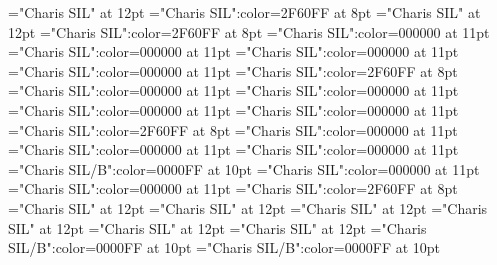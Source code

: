 \documentclass[a4paper]{article}
\begin{document}
\font\xitemptdefinitionLcptsensesensesentrybletDatadicBody="Charis SIL" at 12pt
\font\xlanguagetagenxitemptdefinitionLcptsensesensesentrybletDatadicBody="Charis SIL":color=2F60FF at 8pt
\font\xitemendefinitionLcptsensesensesentrybletDatadicBody="Charis SIL" at 12pt
\font\xlanguagetagenxitemendefinitionLcptsensesensesentrybletDatadicBody="Charis SIL":color=2F60FF at 8pt
\font\relationssensesensesentryletDatadicBody="Charis SIL":color=000000 at 11pt
\font\lexreftargetsrelationssensesensesentryletDatadicBody="Charis SIL":color=000000 at 11pt
\font\sensecrossrefsehlexreftargetsrelationssensesensesentryletDatadicBody="Charis SIL":color=000000 at 11pt
\font{}="Charis SIL":color=000000 at 11pt
\font\xlanguagetagendefinitionptsensesensesentryletDatadicBody="Charis SIL":color=2F60FF at 8pt
\font\examplessensesensesentryletDatadicBody="Charis SIL":color=000000 at 11pt
\font\examplesehexamplessensesensesentryletDatadicBody="Charis SIL":color=000000 at 11pt
\font\translationsexamplessensesensesentryletDatadicBody="Charis SIL":color=000000 at 11pt
\font\translationpttranslationsexamplessensesensesentryletDatadicBody="Charis SIL":color=000000 at 11pt
\font\xlanguagetagentranslationpttranslationsexamplessensesensesentryletDatadicBody="Charis SIL":color=2F60FF at 8pt
\font\xitemrelationssensesensesentryletDatadicBody="Charis SIL":color=000000 at 11pt
\font\lexreftargetsxitemrelationssensesensesentryletDatadicBody="Charis SIL":color=000000 at 11pt
\font\sensecrossrefsehlexreftargetsxitemrelationssensesensesentryletDatadicBody="Charis SIL":color=000000 at 11pt
\font\xhomographnumberptheadwordsehentryletDatadicBody="Charis SIL/B":color=0000FF at 10pt
\font\xsensenumberLcensensesensesentryletDatadicBody="Charis SIL":color=000000 at 11pt
\font{}="Charis SIL":color=000000 at 11pt
\font\xlanguagetagendefinitionLcensensesensesentryletDatadicBody="Charis SIL":color=2F60FF at 8pt
\font\entrycletDatadicBody="Charis SIL" at 12pt
\font\pictureRightNoneentrycletDatadicBody="Charis SIL" at 12pt
\font\picturepictureRightNoneentrycletDatadicBody="Charis SIL" at 12pt
\font\pictureCaptionpictureRightNoneentrycletDatadicBody="Charis SIL" at 12pt
\font\CmPicturepublishStemCaptionSenseNumberpictureCaptionpictureRightNoneentrycletDatadicBody="Charis SIL" at 12pt
\font\CmPicturepublishStemCaptionCaptionPubptpictureCaptionpictureRightNoneentrycletDatadicBody="Charis SIL" at 12pt
\font\headwordsehentrycletDatadicBody="Charis SIL/B":color=0000FF at 10pt
\font\headwordafterentrycletDatadicBody="Charis SIL/B":color=0000FF at 10pt
\end{document}
